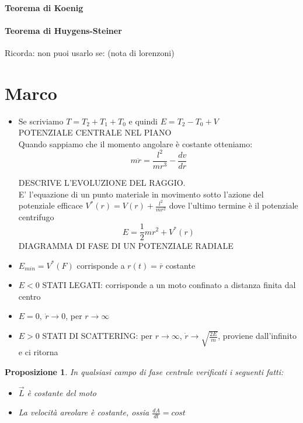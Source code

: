 \documentclass[a4paper,12pt]{article}
\begin{document}
\paragraph{Teorema di Koenig}

\paragraph{Teorema di Huygens-Steiner}
Ricorda: non puoi usarlo se: (nota di lorenzoni)

\section{Marco}	
\begin{itemize}


\item Se scriviamo $T=T_2+T_1+T_0$ e quindi $E=T_2-T_0+V$ \\
POTENZIALE CENTRALE NEL PIANO \\
Quando sappiamo che il momento angolare è costante otteniamo:
\begin{displaymath}
m\ddot{r}=\frac{l^2}{mr^3}-\frac{dv}{dr}
\end{displaymath}

DESCRIVE L'EVOLUZIONE DEL RAGGIO.\\
E' l'equazione di un punto materiale in movimento sotto l'azione del potenziale efficace $V^*(r)=V(r)+\frac{l^2}{mr^2}$ dove l'ultimo termine è il potenziale centrifugo
\begin{displaymath}
E=\frac{1}{2}mr^2 + V^*(r)
\end{displaymath}
DIAGRAMMA DI FASE DI UN POTENZIALE RADIALE
\item $E_{min}=V^*(F)$ corrisponde a $r(t)=\overline{r}$ costante
\item $E<0$ STATI LEGATI: corrisponde a un moto confinato a distanza finita dal centro
\item $E=0,\ \dot{r}\to0$, per $r\to\infty$
\item $E>0$ STATI DI SCATTERING: per $r\to\infty$, $\dot{r}\to\sqrt{\frac{2E}{m}}$, proviene dall'infinito e ci ritorna
\end{itemize}
\newtheorem{prop}{Proposizione}[section]

\begin{prop}
In qualsiasi campo di fase centrale verificati i seguenti fatti:
\begin{itemize} 
\item $\vec{L}$ è costante del moto
\item La velocità areolare è costante, ossia $\frac{dA}{dt}=cost$

\end{itemize}
 

\end{prop}
\end{document}

